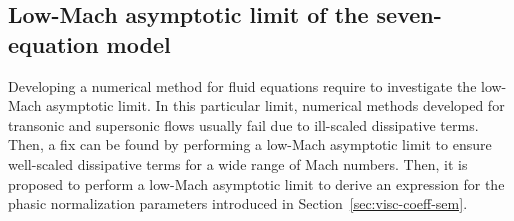 \documentclass[preprint,10pt]{elsarticle}
\newcommand{\norm}{\textrm{norm}}
\renewcommand{\Re}{\textrm{Re}}
\newcommand{\Pe}{\textrm{P\'e}}
\newcommand{\eqt}[1]{Eq.~(\ref{#1})}                     %
\newcommand{\sct}[1]{Section~\ref{#1}}                   %
\begin{document}
\subsection{Low-Mach asymptotic limit of the seven-equation model}\label{sec:low-Mach-sem}
Developing a numerical method for fluid equations require to investigate the low-Mach asymptotic limit. In this particular limit, numerical methods developed for transonic and supersonic flows usually fail due to ill-scaled dissipative terms. Then, a fix can be found by performing a low-Mach asymptotic limit to ensure well-scaled dissipative terms for a wide range of Mach numbers. Then, it is proposed to perform a low-Mach asymptotic limit to derive an expression for the phasic normalization parameters introduced in \sct{sec:visc-coeff-sem}. 
%
%
\end{document}
